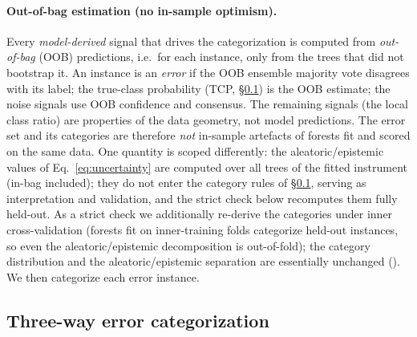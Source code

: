 \paragraph{Out-of-bag estimation (no in-sample optimism).} Every
\emph{model-derived} signal that drives the categorization is computed from
\emph{out-of-bag} (OOB) predictions, i.e.\ for each instance, only from the
trees that did not bootstrap it. An instance is an \emph{error} if the OOB
ensemble majority vote disagrees with its label; the true-class probability (TCP,
\S\ref{sec:method:triage}) is the OOB estimate; the noise signals use OOB
confidence and consensus. The remaining signals (the local class ratio) are
properties of the data geometry, not model predictions. The error set and its
categories are therefore \emph{not} in-sample artefacts of forests fit and scored
on the same data. One quantity is scoped differently: the aleatoric/epistemic
values of Eq.~\eqref{eq:uncertainty} are computed over all trees of the fitted
instrument (in-bag included); they do not enter the category rules of
\S\ref{sec:method:triage}, serving as interpretation and validation, and the
strict check below recomputes them fully held-out. As a strict check we additionally re-derive the categories under
inner cross-validation (forests fit on inner-training folds categorize held-out
instances, so even the aleatoric/epistemic decomposition is out-of-fold); the
category distribution and the aleatoric/epistemic separation are essentially
unchanged (). We then categorize each error instance.

\subsection{Three-way error categorization}\label{sec:method:triage}

